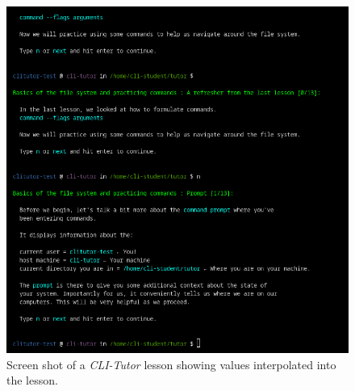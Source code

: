 \begin{figure}[htbp]
	\centering
	\includegraphics[width=1\textwidth]{img/cliexpansionfull}
	\caption{Screen shot of a \textit{CLI-Tutor} lesson showing values interpolated into the lesson.}
	\label{fig:webversion}
\end{figure}


